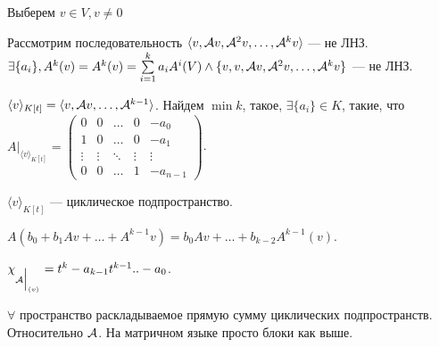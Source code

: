 Выберем  $v \in V, v \neq 0$

Рассмотрим последовательность  $\langle v, \mathcal{A} v, \mathcal{A}^2 v,\ldots, \mathcal{A}^k v \rangle$ --- не ЛНЗ.
$\exists \{a_i\}, A^k(v) = A^k(v) = \sum\limits_{i=1}^k a_i A^i(V) \land \{v, v, \mathcal{A} v, \mathcal{A}^2 v,\ldots, \mathcal{A}^k v\}$ --- не ЛНЗ.

\begin{statement}
    $\langle v \rangle_{K[t]} = \langle v, \mathcal{A} v, \ldots, \mathcal{A}^{k-1} \rangle$. Найдем $\min k$, такое, $\exists \{a_i\} \! \in K$, такие, что  $A\Big|_{\langle v\rangle_{K[t]}} = \begin{pmatrix} 0 & 0 & \ldots & 0 & -a_0 \\ 1 & 0 & \ldots & 0 & -a_1 \\ \vdots & \vdots & \ddots & \vdots & \vdots\\ 0 & 0 & \ldots & 1 & -a_{n-1} \end{pmatrix}$.

    $\langle v\rangle_{K[t]}$ --- циклическое подпространство. 

    $A(b_0 + b_1 Av + \ldots + A^{k-1}v) = b_0Av + \ldots + b_{k-2}A^{k-1}(v)$.
\end{statement}
\begin{statement}
    $\chi_{\mathcal{A} \Big|_{\langle v \rangle}} = t^k - a_{k-1}t^{k-1} .. - a_0$.
\end{statement}
\begin{statement}
    $\forall$ пространство раскладываемое прямую сумму циклических подпространств. Относительно $\mathcal{A}$. На матричном языке просто блоки как выше.
\end{statement}
